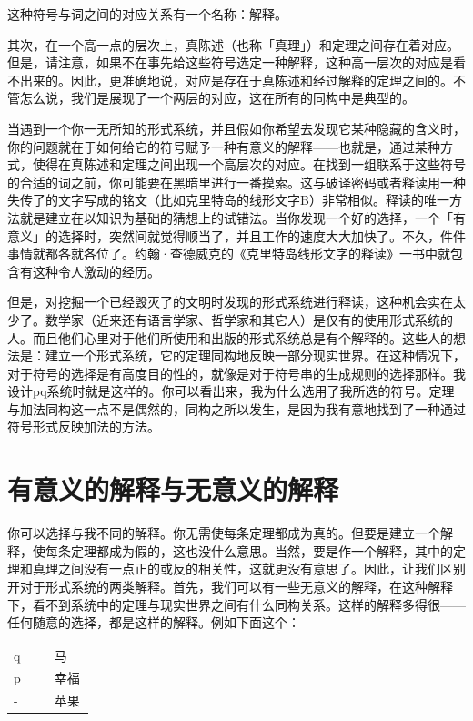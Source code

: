 \documentclass[
  12pt,
  twoside,
  openright,
  oldfontcommands,
]{memoir}
\begin{document}
这种符号与词之间的对应关系有一个名称：解释。

其次，在一个高一点的层次上，真陈述（也称「真理」）和定理之间存在着对应。但是，请注意，如果不在事先给这些符号选定一种解释，这种高一层次的对应是看不出来的。因此，更准确地说，对应是存在于真陈述和经过解释的定理之间的。不管怎么说，我们是展现了一个两层的对应，这在所有的同构中是典型的。

当遇到一个你一无所知的形式系统，并且假如你希望去发现它某种隐藏的含义时，你的问题就在于如何给它的符号赋予一种有意义的解释------也就是，通过某种方式，使得在真陈述和定理之间出现一个高层次的对应。在找到一组联系于这些符号的合适的词之前，你可能要在黑暗里进行一番摸索。这与破译密码或者释读用一种失传了的文字写成的铭文（比如克里特岛的线形文字B）非常相似。释读的唯一方法就是建立在以知识为基础的猜想上的试错法。当你发现一个好的选择，一个「有意义」的选择时，突然间就觉得顺当了，并且工作的速度大大加快了。不久，件件事情就都各就各位了。约翰·查德威克的《克里特岛线形文字的释读》一书中就包含有这种令人激动的经历。

但是，对挖掘一个已经毁灭了的文明时发现的形式系统进行释读，这种机会实在太少了。数学家（近来还有语言学家、哲学家和其它人）是仅有的使用形式系统的人。而且他们心里对于他们所使用和出版的形式系统总是有个解释的。这些人的想法是：建立一个形式系统，它的定理同构地反映一部分现实世界。在这种情况下，对于符号的选择是有高度目的性的，就像是对于符号串的生成规则的选择那样。我设计pq系统时就是这样的。你可以看出来，我为什么选用了我所选的符号。定理与加法同构这一点不是偶然的，同构之所以发生，是因为我有意地找到了一种通过符号形式反映加法的方法。

\section{有意义的解释与无意义的解释}

你可以选择与我不同的解释。你无需使每条定理都成为真的。但要是建立一个解释，使每条定理都成为假的，这也没什么意思。当然，要是作一个解释，其中的定理和真理之间没有一点正的或反的相关性，这就更没有意思了。因此，让我们区别开对于形式系统的两类解释。首先，我们可以有一些无意义的解释，在这种解释下，看不到系统中的定理与现实世界之间有什么同构关系。这样的解释多得很------任何随意的选择，都是这样的解释。例如下面这个：

\begin{longtable}[]{>{\raggedright\arraybackslash}p{0.47\linewidth} >{\raggedright\arraybackslash}p{0.47\linewidth}}
\toprule\noalign{}
\endhead
\bottomrule\noalign{}
\endlastfoot
q　 & 马 \\
p　 & 幸福 \\
-　 & 苹果 \\
\end{longtable}
\end{document}
